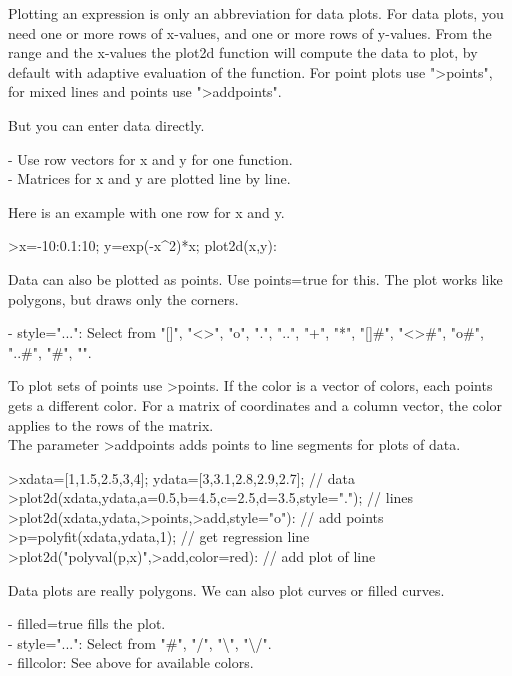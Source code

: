 \documentclass[a4paper,10pt]{article}
\begin{document}
\begin{eulernotebook}
\begin{eulercomment}
\begin{eulercomment}
\begin{eulercomment}
\begin{eulercomment}
\begin{eulercomment}
Plotting an expression is only an abbreviation for data plots. For data plots, you
need one or more rows of x-values, and one or more rows of y-values. From the range
and the x-values the plot2d function will compute the data to plot, by default with
adaptive evaluation of the function. For point plots use "\textgreater{}points", for mixed lines
and points use "\textgreater{}addpoints".

But you can enter data directly.

- Use row vectors for x and y for one function.\\
- Matrices for x and y are plotted line by line.

Here is an example with one row for x and y.

\end{eulercomment}
\begin{eulerprompt}
>x=-10:0.1:10; y=exp(-x^2)*x; plot2d(x,y):
\end{eulerprompt}
\begin{eulercomment}
Data can also be plotted as points. Use points=true for this. The plot works like
polygons, but draws only the corners.

- style="...": Select from "[]", "\textless{}\textgreater{}", "o", ".", "..", "+", "*", "[]#", "\textless{}\textgreater{}#", "o#",
"..#", "#", "\textbar{}".

To plot sets of points use \textgreater{}points. If the color is a vector of colors, each points\\
gets a different color. For a matrix of coordinates and a column vector, the color
applies to the rows of the matrix.\\
The parameter \textgreater{}addpoints adds points to line segments for plots of data.
\end{eulercomment}
\begin{eulerprompt}
>xdata=[1,1.5,2.5,3,4]; ydata=[3,3.1,2.8,2.9,2.7]; // data
>plot2d(xdata,ydata,a=0.5,b=4.5,c=2.5,d=3.5,style="."); // lines
>plot2d(xdata,ydata,>points,>add,style="o"): // add points
>p=polyfit(xdata,ydata,1); // get regression line
>plot2d("polyval(p,x)",>add,color=red): // add plot of line
\end{eulerprompt}
\begin{eulercomment}
Data plots are really polygons. We can also plot curves or filled curves.

- filled=true fills the plot.\\
- style="...": Select from "#", "/", "\textbackslash{}", "\textbackslash{}/".\\
- fillcolor: See above for available colors.


\end{eulercomment}
\end{eulercomment}
\end{eulercomment}
\end{eulercomment}
\end{eulercomment}
\end{eulernotebook}
\end{document}
